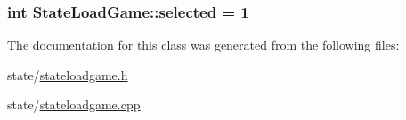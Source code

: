 \subsubsection[{\texorpdfstring{selected}{selected}}]{\setlength{\rightskip}{0pt plus 5cm}int State\+Load\+Game\+::selected = 1\hspace{0.3cm}{\ttfamily [protected]}}\hypertarget{classStateLoadGame_adcf08bbcda5c396a52d513e9576f2b23}{}\label{classStateLoadGame_adcf08bbcda5c396a52d513e9576f2b23}


The documentation for this class was generated from the following files\+:\begin{DoxyCompactItemize}
\item 
state/\hyperlink{stateloadgame_8h}{stateloadgame.\+h}\item 
state/\hyperlink{stateloadgame_8cpp}{stateloadgame.\+cpp}\end{DoxyCompactItemize}
